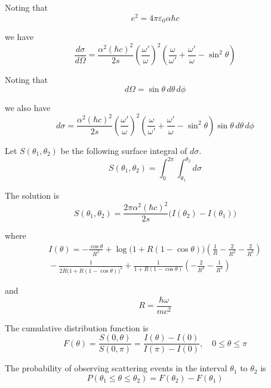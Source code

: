 Noting that
\begin{equation*}
e^2=4\pi\varepsilon_0\alpha\hbar c
\end{equation*}

we have
\begin{equation*}
\frac{d\sigma}{d\Omega}
=\frac{\alpha^2(\hbar c)^2}{2s}
\left(\frac{\omega'}{\omega}\right)^2
\left(
\frac{\omega}{\omega'}+\frac{\omega'}{\omega}-\sin^2\theta
\right)
\end{equation*}

Noting that
\begin{equation*}
d\Omega=\sin\theta\,d\theta\,d\phi
\end{equation*}

we also have
\begin{equation*}
d\sigma
=\frac{\alpha^2(\hbar c)^2}{2s}
\left(\frac{\omega'}{\omega}\right)^2
\left(
\frac{\omega}{\omega'}+\frac{\omega'}{\omega}-\sin^2\theta
\right)
\sin\theta\,d\theta\,d\phi
\end{equation*}

Let $S(\theta_1,\theta_2)$ be the following surface integral of $d\sigma$.
\begin{equation*}
S(\theta_1,\theta_2)=\int_0^{2\pi}\int_{\theta_1}^{\theta_2}d\sigma
\end{equation*}

The solution is
\begin{equation*}
S(\theta_1,\theta_2)=\frac{2\pi\alpha^2(\hbar c)^2}{2s}\bigl(I(\theta_2)-I(\theta_1)\bigr)
\end{equation*}

where
\begin{multline*}
I(\theta)=-\frac{\cos\theta}{R^2}
+\log\bigl(1+R(1-\cos\theta)\bigr)\left(\frac{1}{R}-\frac{2}{R^2}-\frac{2}{R^3}\right)
\\
{}-\frac{1}{2R\bigl(1+R(1-\cos\theta)\bigr)^2}
+\frac{1}{1+R(1-\cos\theta)}\left(-\frac{2}{R^2}-\frac{1}{R^3}\right)
\end{multline*}

and
\begin{equation*}
R=\frac{\hbar\omega}{mc^2}
\end{equation*}

The cumulative distribution function is
\begin{equation*}
F(\theta)
=\frac{S(0,\theta)}{S(0,\pi)}
=\frac{I(\theta)-I(0)}{I(\pi)-I(0)},
\quad
0\le\theta\le\pi
\end{equation*}

The probability of observing scattering events in the interval $\theta_1$ to $\theta_2$ is
\begin{equation*}
P(\theta_1\le\theta\le\theta_2)=F(\theta_2)-F(\theta_1)
\end{equation*}

